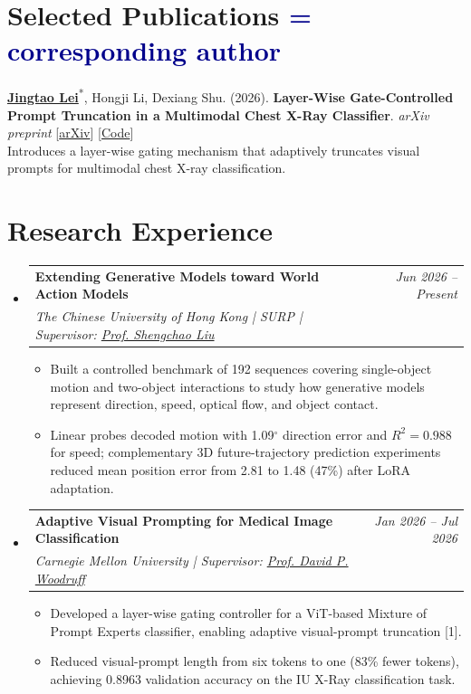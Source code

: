 \documentclass[a4paper,11pt]{article}
\makeatletter
\newcommand{\resumeSubheading}[4]{
\vspace{0.5mm}\item
    \begin{tabular*}{0.98\textwidth}[t]{l@{\extracolsep{\fill}}r}
        \textbf{#1} & \textit{\footnotesize{#4}} \\
        \textit{\footnotesize{#3}} &  \footnotesize{#2}\\
    \end{tabular*}
    \vspace{-2.4mm}
}
\newcommand{\resumeSubHeadingListStart}{\begin{itemize}[leftmargin=*,labelsep=1mm]}
\newcommand{\resumeItemListStart}{\begin{itemize}[leftmargin=*,labelsep=1mm,itemsep=0.5mm]}
\newcommand{\resumeSubHeadingListEnd}{\end{itemize}\vspace{2mm}}
\newcommand{\resumeItemListEnd}{\end{itemize}\vspace{-2mm}}
\makeatother
\begin{document}
\section{\textbf{Selected Publications} \hfill \textcolor{darkblue}{\scriptsize * = corresponding author}}
\vspace{1mm}
\small{
\begin{enumerate}[leftmargin=*, labelsep=0.5em, align=left, widest={[\textbf{S.1}]}, itemindent=0em, label={\textbf{[\arabic*]}]}]

\item[\textbf{[1]}] \underline{\textbf{Jingtao Lei}}\textsuperscript{*}, Hongji Li, Dexiang Shu. (2026). \textbf{Layer-Wise Gate-Controlled Prompt Truncation in a Multimodal Chest X-Ray Classifier}. \textit{arXiv preprint} [\href{https://arxiv.org/abs/2609.06590}{arXiv}] [\href{https://github.com/jingtaolei/mope-dynamic-prompt-truncation}{Code}] \\
{\footnotesize\color{subtle}Introduces a layer-wise gating mechanism that adaptively truncates visual prompts for multimodal chest X-ray classification.}

\end{enumerate}
}

\section{\textbf{Research Experience}}
\vspace{0.3mm}
\resumeSubHeadingListStart
\resumeSubheading
    {Extending Generative Models toward World Action Models}{}
    {The Chinese University of Hong Kong | SURP | Supervisor: \href{https://chao1224.github.io/}{Prof. Shengchao Liu}}
    {Jun 2026 -- Present}
\resumeItemListStart
    \item Built a controlled benchmark of 192 sequences covering single-object motion and two-object interactions to study how generative models represent direction, speed, optical flow, and object contact.
    \item Linear probes decoded motion with 1.09$^\circ$ direction error and $R^2=0.988$ for speed; complementary 3D future-trajectory prediction experiments reduced mean position error from 2.81 to 1.48 (47\%) after LoRA adaptation.
\resumeItemListEnd

\resumeSubheading
    {Adaptive Visual Prompting for Medical Image Classification}{}
    {Carnegie Mellon University | Supervisor: \href{https://www.cs.cmu.edu/~dwoodruf/}{Prof. David P. Woodruff}}
    {Jan 2026 -- Jul 2026}
\resumeItemListStart
    \item Developed a layer-wise gating controller for a ViT-based Mixture of Prompt Experts classifier, enabling adaptive visual-prompt truncation [1].
    \item Reduced visual-prompt length from six tokens to one (83\% fewer tokens), achieving 0.8963 validation accuracy on the IU X-Ray classification task.
\resumeItemListEnd
\resumeSubHeadingListEnd
\vspace{-6mm}
\end{document}
